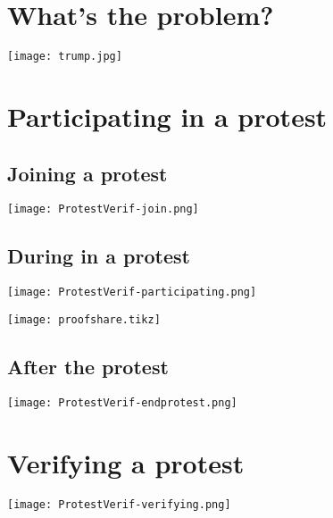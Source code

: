 \mode*

\section{What's the problem?}

\begin{frame}
  \centering
  \texttt{[image: trump.jpg]}
\end{frame}


\section[Participating]{Participating in a protest}

\subsection{Joining a protest}

\begin{frame}
  \centering
  \texttt{[image: ProtestVerif-join.png]}
\end{frame}

\subsection{During in a protest}

\begin{frame}
  \centering
  \texttt{[image: ProtestVerif-participating.png]}
\end{frame}

\begin{frame}
  \centering
  \texttt{[image: proofshare.tikz]}
\end{frame}

\subsection{After the protest}

\begin{frame}
  \centering
  \texttt{[image: ProtestVerif-endprotest.png]}
\end{frame}


\section[Verifying]{Verifying a protest}

\begin{frame}
  \centering
  \texttt{[image: ProtestVerif-verifying.png]}
\end{frame}


